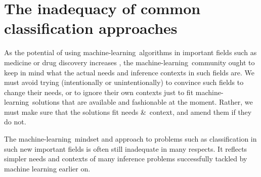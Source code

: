 \documentclass[a4paper,12pt,%
onecolumn,oneside,article,%
british%
]{memoir}
\newcommand*{\amp}{\&}
\newcommand*{\asudedication}[1]{%
{\par\centering\textit{#1}\par}}
\renewcommand*{\|}[1][]{\nonscript\:#1\vert\nonscript\:\mathopen{}}
\newcommand*{\ml}{machine-learning}
\begin{document}




\section{The inadequacy of common classification approaches}
\label{sec:goal_class}

As the potential of using \ml\ algorithms in important fields such as medicine or drug discovery increases \autocites{lundervoldetal2019,chenetal2018,green2019}, the \ml\ community ought to keep in mind what the actual needs and inference contexts in such fields are. We must avoid trying (intentionally or unintentionally) to convince such fields to change their needs, or to ignore their own contexts just to fit \ml\ solutions that are available and fashionable at the moment. Rather, we must make sure that the solutions fit needs \amp\ context, and amend them if they do not.

The \ml\ mindset and approach to problems such as classification in such new important fields is often still inadequate in many respects. It reflects simpler needs and contexts of many  inference problems successfully tackled by machine learning earlier on.
\end{document}

